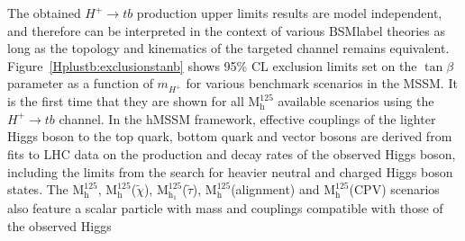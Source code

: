 The obtained $H^+\to tb$ production upper limits results are model independent, and therefore can be interpreted in the context of various \acrshort{BSMlabel} theories as long as the topology and kinematics of the targeted channel remains equivalent. Figure~\ref{Hplustb:exclusionstanb} shows 95\% CL exclusion limits set on the $\tan\beta$ parameter as a function of $m_{H^+}$ for various benchmark scenarios in the MSSM. It is the first time that they are shown for all $\text{M}^{125}_\text{h}$ available scenarios using the $H^+\to tb$ channel. In the hMSSM framework, effective couplings of the lighter Higgs boson to the top quark, bottom quark and vector bosons are derived from fits to LHC data on the production and decay rates of the observed Higgs boson, including the limits from the search for heavier neutral and charged Higgs boson states. The $\text{M}^{125}_\text{h}$, $\text{M}^{125}_\text{h}$($\tilde{\chi}$), $\text{M}^{125}_{\text{h}_1}$($\tilde{\tau}$), $\text{M}^{125}_\text{h}$(alignment) and $\text{M}^{125}_\text{h}$(CPV) scenarios also feature a scalar particle with mass and couplings compatible with those of the observed Higgs
